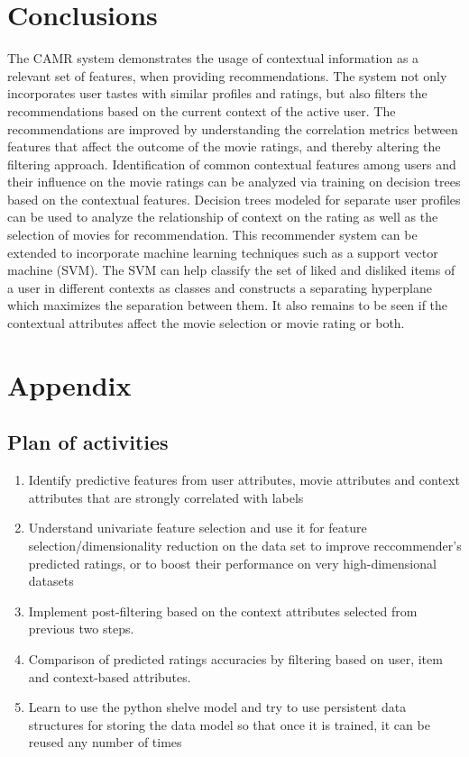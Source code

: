 \documentclass{article}
\begin{document}
\section{Conclusions}
The CAMR system demonstrates the usage of contextual information as a relevant set of features, when providing recommendations. The system not only incorporates user tastes with similar profiles and ratings, but also filters the recommendations based on the current context of the active user. The recommendations are improved by understanding the correlation metrics between features that affect the outcome of the movie ratings, and thereby altering the filtering approach. Identification of common contextual features among users and their influence on the movie ratings can be analyzed via training on decision trees based on the contextual features. Decision trees modeled for separate user profiles can be used to analyze the relationship of context on the rating as well as the selection of movies for recommendation. This recommender system can be extended to incorporate machine learning techniques such as a support vector machine (SVM). The SVM can help classify the set of liked and disliked items of a user in different contexts as classes and constructs a separating hyperplane which maximizes the separation between them. It also remains to be seen if the contextual attributes affect the movie selection or movie rating or both.

\section{Appendix}

\subsection{Plan of activities}

\begin{enumerate}
\item Identify predictive features from user attributes, movie attributes and context attributes that are strongly correlated with labels
\item Understand univariate feature selection and use it for feature selection/dimensionality reduction on the data set to improve reccommender's predicted ratings, or to boost their performance on very high-dimensional datasets
\item Implement post-filtering based on the context attributes selected from previous two steps. 
\item Comparison of predicted ratings accuracies by filtering based on user, item and context-based attributes. 
\item Learn to use the python shelve model and try to use persistent data structures for storing the data model so that once it is trained, it can be reused any number of times
\end{enumerate}
\end{document}
